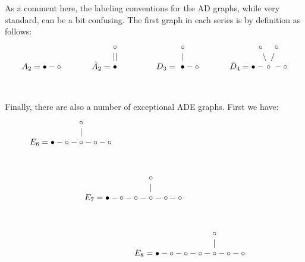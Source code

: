 \documentclass[12pt]{amsbook}
\begin{document}
As a comment here, the labeling conventions for the AD graphs, while very standard, can be a bit confusing. The first graph in each series is by definition as follows:
$$A_2=\bullet-\circ\hskip13mm 
\tilde{A}_2=\begin{matrix}
\circ\\
||\\
\bullet\\
&\\
&\\
\end{matrix}\hskip13mm 
D_3=\begin{matrix}\ \circ\\
\ |\\
\ \bullet \\
\ \\
\  \end{matrix}-\circ \hskip13mm
\tilde{D}_4=\bullet-\!\!\!\!\!\begin{matrix}
\circ\hskip5mm \circ\\
\backslash\ \,\slash\\
\circ\\
&\\
&\\
\end{matrix}\!\!\!\!\!\!\!\!\!\!-\circ$$
\vskip-7mm

Finally, there are also a number of exceptional ADE graphs. First we have:
$$E_6=\bullet-\circ-
\begin{matrix}\circ\\
|\\
\circ\\
\ \\
\ \end{matrix}-
\circ-\circ\hskip71mm$$
\vskip-13mm
$$E_7=\bullet-\circ-\circ-
\begin{matrix}\circ\\
|\\
\circ\\
\ \
\\
\ \end{matrix}-
\circ-\circ\hskip18mm$$
\vskip-15mm
$$\hskip30mm E_8=\bullet-\circ-\circ-\circ-
\begin{matrix}\circ\\
|\\
\circ\\
\ \\
\ \end{matrix}-
\circ-\circ$$
\vskip-5mm
\end{document}
